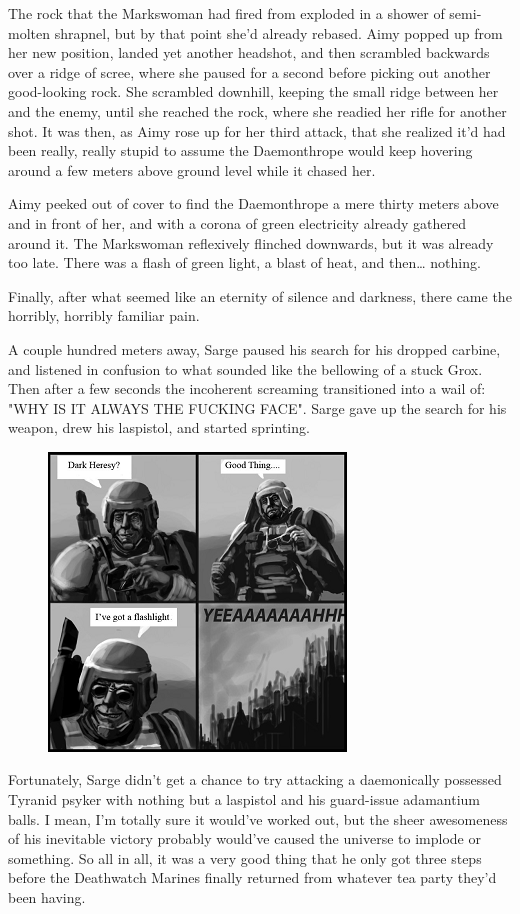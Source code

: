 The rock that the Markswoman had fired from exploded in a shower of semi-molten shrapnel, but by that point she'd already rebased. 
Aimy popped up from her new position, landed yet another headshot, and then scrambled backwards over a ridge of scree, where she paused for a second before picking out another good-looking rock. 
She scrambled downhill, keeping the small ridge between her and the enemy, until she reached the rock, where she readied her rifle for another shot. 
It was then, as Aimy rose up for her third attack, that she realized it'd had been really, really stupid to assume the Daemonthrope would keep hovering around a few meters above ground level while it chased her. 


Aimy peeked out of cover to find the Daemonthrope a mere thirty meters above and in front of her, and with a corona of green electricity already gathered around it. 
The Markswoman reflexively flinched downwards, but it was already too late. 
There was a flash of green light, a blast of heat, and then… nothing.

Finally, after what seemed like an eternity of silence and darkness, there came the horribly, horribly familiar pain.

A couple hundred meters away, Sarge paused his search for his dropped carbine, and listened in confusion to what sounded like the bellowing of a stuck Grox. 
Then after a few seconds the incoherent screaming transitioned into a wail of: 
"WHY IS IT ALWAYS THE FUCKING FACE". 
Sarge gave up the search for his weapon, drew his laspistol, and started sprinting.

\begin{figure}
	\begin{center}
		\includegraphics[width=\figwidth]{pics/16/53.png}
	\end{center}
\end{figure}
Fortunately, Sarge didn't get a chance to try attacking a daemonically possessed Tyranid psyker with nothing but a laspistol and his guard-issue adamantium balls. 
I mean, I'm totally sure it would've worked out, but the sheer awesomeness of his inevitable victory probably would've caused the universe to implode or something. 
So all in all, it was a very good thing that he only got three steps before the Deathwatch Marines finally returned from whatever tea party they'd been having.

